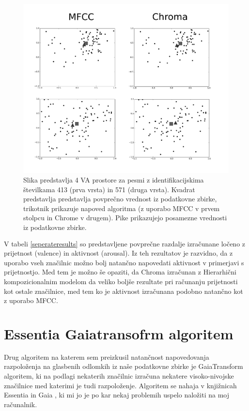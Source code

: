 \documentclass[a4paper, 12pt]{book}
\begin{document}
{\begin{figure}[hbt]
\centering
\includegraphics[width=130mm]{images/graphs1.png}
\caption{Slika predstavlja 4 VA prostore za pesmi z identifikacijskima številkama 413 (prva vrsta) in 571 (druga vrsta). Kvadrat predstavlja predstavlja povprečno vrednost iz podatkovne zbirke, trikotnik prikazuje napoved algoritma (z uporabo MFCC v prvem stolpcu in Chrome v drugem). Pike prikazujejo posamezne vrednosti iz podatkovne zbirke.}
\label{graphs}
\end{figure}

V tabeli \ref{seperateresults} so predstavljene povprečne razdalje  izračunane ločeno z prijetnost (valence) in aktivnost (arousal). Iz teh rezultatov je razvidno, da z uporabo vseh značilnic možno bolj natančno  napovedati aktivnost v primerjavi s prijetnostjo. Med tem je možno še opaziti, da Chroma izračunan z Hierarhični kompozicionalnim modelom da veliko boljše rezultate pri računanju prijetnosti kot ostale značilnice, med tem ko je aktivnost izračunana podobno natančno kot z uporabo MFCC. 



\section{Essentia Gaiatransofrm algoritem}

Drug algoritem na katerem sem preizkusil natančnost napovedovanja razpoloženja na glasbenih odlomkih iz naše podatkovne zbirke je GaiaTransform algoritem, ki na podlagi nekaterih značilnic izračuna nekatere visoko-nivojske značilnice \cite{bogdanov2013form} med katerimi je tudi razpoloženje. Algoritem se nahaja v knjižnicah Essentia in Gaia \cite{bogdanov2013essentia}, ki mi jo je po kar nekaj problemih uspelo naložiti na moj računalnik. 

}
\end{document}
